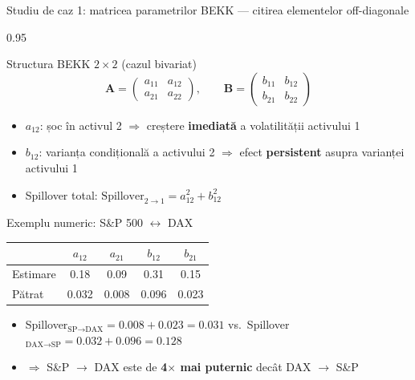 \documentclass[9pt, aspectratio=169, t]{beamer}
\begin{document}
\begin{frame}{Studiu de caz 1: matricea parametrilor BEKK --- citirea elementelor off-diagonale}
    \begin{cminipage}{0.95\textwidth}
    {\footnotesize
    \begin{block}{Structura BEKK $2 \times 2$ (cazul bivariat)}
        \[
            \mathbf{A} = \begin{pmatrix} a_{11} & a_{12} \\ a_{21} & a_{22} \end{pmatrix}, \qquad
            \mathbf{B} = \begin{pmatrix} b_{11} & b_{12} \\ b_{21} & b_{22} \end{pmatrix}
        \]
        \begin{itemize}\setlength{\itemsep}{1pt}
            \item $a_{12}$: șoc în activul 2 $\Rightarrow$ creștere \textbf{imediată} a volatilității activului 1
            \item $b_{12}$: varianța condițională a activului 2 $\Rightarrow$ efect \textbf{persistent} asupra varianței activului 1
            \item Spillover total: $\text{Spillover}_{2 \rightarrow 1} = a_{12}^2 + b_{12}^2$
        \end{itemize}
    \end{block}
    \begin{exampleblock}{Exemplu numeric: S\&P 500 $\leftrightarrow$ DAX}
        {\small
        \begin{center}
        \begin{tabular}{l|cc|cc}
            \hline
            & $a_{12}$ & $a_{21}$ & $b_{12}$ & $b_{21}$ \\
            \hline
            Estimare & 0.18 & 0.09 & 0.31 & 0.15 \\
            Pătrat   & 0.032 & 0.008 & 0.096 & 0.023 \\
            \hline
        \end{tabular}
        \end{center}
        }
        \begin{itemize}\setlength{\itemsep}{0pt}
            \item Spillover$_{\text{SP}\rightarrow\text{DAX}} = 0.008 + 0.023 = 0.031$ \quad vs.\ Spillover$_{\text{DAX}\rightarrow\text{SP}} = 0.032 + 0.096 = 0.128$
            \item $\Rightarrow$ S\&P $\rightarrow$ DAX este de \textbf{4$\times$ mai puternic} decât DAX $\rightarrow$ S\&P
        \end{itemize}
    \end{exampleblock}
    }
    \end{cminipage}
\end{frame}
\end{document}
